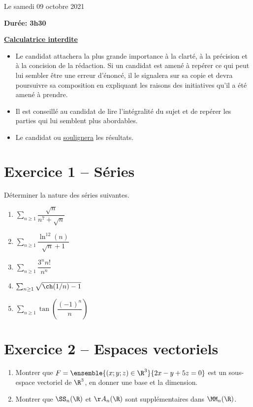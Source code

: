 \documentclass[twoside,french,11pt]{VcCours}
\begin{document}

\begin{center}
\large 
Le samedi 09 octobre 2021

\bigskip
\textbf{Durée: 3h30}

\bigskip
\large\underline{\textbf{Calculatrice interdite}}
\end{center}

\bigskip
\begin{itemize}
  \item Le candidat attachera la plus grande importance à la clarté, à la précision et à la concision de la rédaction. Si un candidat est amené à repérer ce qui peut lui sembler être une erreur d'énoncé, il le signalera sur sa copie et devra poursuivre sa composition en expliquant les raisons des initiatives qu'il a été amené à prendre.
  \item Il est conseillé au candidat de lire l'intégralité du sujet et de repérer les parties qui lui semblent plus abordables.
  \item Le candidat  ou \underline{soulignera} les résultats. 
  \end{itemize}
\separationTitre


\section*{Exercice 1 -- Séries}
  Déterminer la nature des séries suivantes. 
  
  \begin{multicols}{3}
  \begin{enumerate}
  \item $\sum_{n \geq 1} \dfrac{\sqrt{n}}{n^7+\sqrt{n}}$
  \item $\sum_{n \geq 1} \dfrac{\ln^{12}(n)}{\sqrt{n}+1}$
  \columnbreak
  \item $\sum_{n \geq 1} \dfrac{3^n n!}{n^n}$
  \item $\sum_{n \geq 1} \sqrt{\ch(1/n)-1}$
  \columnbreak
  \item $\sum_{n \geq 1} \tan \left( \dfrac{(-1)^n}{n}\right)$
  \end{enumerate}
  \end{multicols}

\section*{Exercice 2 -- Espaces vectoriels}
\begin{enumerate}
  \item Montrer que $F=\ensemble{(x;y;z)\in\R^3}{2x-y+5z=0}$ est un sous-espace
  vectoriel de $\R^3$, en donner une base et la dimension.
  \item Montrer que $\SS_n(\R)$ et $\AA_n(\R)$ sont supplémentaires dans $\MM_n(\R)$.
\end{enumerate}
\end{document}
